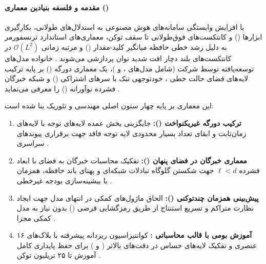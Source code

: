 \item {}

\paragraph*{مقدمه و فلسفه بنیادین معماری ()}
با افزایش وابستگی سامانه‌های هوش مصنوعی به استدلال‌های طولانی، بکارگیری ابزارها () و کانتکست‌های فوق‌طولانی تا سقف  توکن، معماری‌های استاندارد ترنسفورمر به دلیل رشد خطی حافظه میانگیر کلید-مقدار () و مرتبه زمانی $\mathcal{O}(L^2)$ در کانتکست‌های بلند دچار افت شدید توان پردازشی می‌شوند \cite{vaswani2017attention}. خانواده مدل‌های  توسعه‌یافته توسط شرکت  (شامل مدل‌های ،  و )، یک معماری دورگه () بر پایه ترکیب لایه‌های فضای حالت خطی ، خودتوجهی تنک با سرهای اشتراکی () و شبکه خبرگان فشرده نوآورانه () را معرفی می‌نماید \cite{dao2024transformers, waleffe2024empirical, nvidia2025nemotronh}.

این معماری بر پایه چهار ستون اصلی مهندسی و تئوریک بنا شده است:
\begin{enumerate}
    \item \textbf{ترکیب دورگه غیریکنواخت ():} جایگزینی بخش عمده لایه‌های توجه با لایه‌های زمان‌ثابت  و ابقای تعداد بسیار محدودی لایه توجه فاقد  جهت برقراری پیوندهای سراسری \cite{puvvada2025swan}.
    \item \textbf{معماری خبرگان در فضای پنهان ():} تفکیک محاسبات خبرگان به فضای با ابعاد فشرده $\ell < d$ جهت شکستن گلوگاه تبادلات شبکه‌ای  و پهنای باند حافظه، همزمان با بیشینه‌سازی بودجه غیرخطی \cite{nvidia2025nemotronh}.
    \item \textbf{پیش‌بینی همزمان چندتوکنی ():} الحاق ماژول‌های کمکی در انتهای مدل جهت ایجاد نظارت متراکم و تسریع استنتاج از طریق رمزگشایی فرضی () بدون نیاز به مدل کمکی مجزا \cite{gloeckle2024better, deepseek2025v3}.
    \item \textbf{آموزش بومی با قالب محاسباتی :} کوانتیزاسیون ریزدانه پیشرفته با بلاک‌های ۱۶ عنصری و تفکیک لایه‌های حساس در دقت‌های بالاتر ( و ) برای حفظ پایداری کامل آموزش تا ۲۵ تریلیون توکن \cite{nvidia2025nvfp4, chen2025scaling}.
\end{enumerate}

